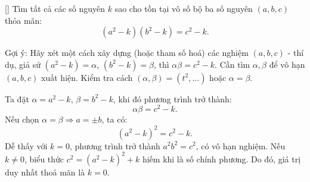 \documentclass[../04-diophantine-equations.tex]{subfiles}
\begin{document}
\begin{exercise*}\label{example:RUS-2015-TST-D10-P3}[\textbf{}]
	Tìm tất cả các số nguyên \( k \) sao cho tồn tại vô số bộ ba số nguyên \( (a, b, c) \) thỏa mãn:
	\[
		(a^2 - k)(b^2 - k) = c^2 - k.
	\]
\end{exercise*}

\begin{remark*}
	Gợi ý: Hãy xét một cách xây dựng (hoặc tham số hoá) các nghiệm \((a,b,c)\) - thí dụ, giả sử \((a^2-k)=\alpha\), \((b^2-k)=\beta\), thì \(\alpha\beta=c^2-k\).
	Cần tìm \(\alpha,\beta\) để vô hạn \((a,b,c)\) xuất hiện. Kiểm tra cách \((\alpha,\beta)=(t^2,\dots)\) hoặc \(\alpha=\beta\).
\end{remark*}

\begin{story*}
    Ta đặt \(\alpha = a^2 - k\), \(\beta = b^2 - k\), khi đó phương trình trở thành:
    \[
        \alpha \beta = c^2 - k.
    \]
    Nếu chọn \( \alpha = \beta \Rightarrow a = \pm b \), ta có:
    \[
        (a^2 - k)^2 = c^2 - k.
    \]
    Dễ thấy với \( k = 0 \), phương trình trở thành \( a^2 b^2 = c^2 \), có vô hạn nghiệm.  
    Nếu \( k \ne 0 \), biểu thức \( c^2 = (a^2 - k)^2 + k \) hiếm khi là số chính phương.  
    Do đó, giá trị duy nhất thoả mãn là \( \boxed{k = 0} \).
\end{story*}
\end{document}
